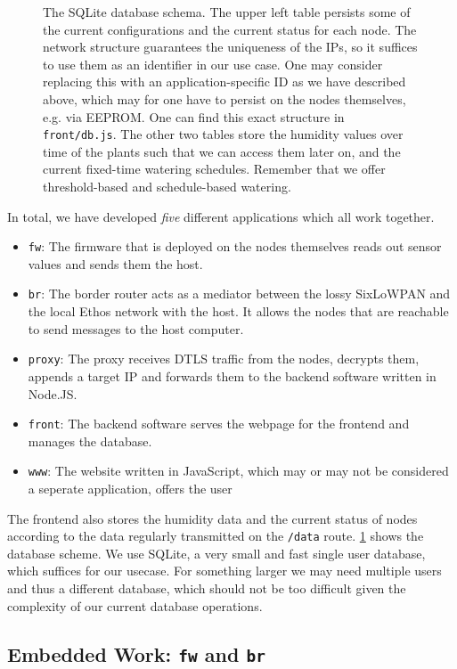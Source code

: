\documentclass[acmtog, language=english, nonacm]{acmart}
\begin{document}
\begin{figure}[!hbtp]
        \caption{The SQLite database schema. The upper left table persists some of the current configurations and the current status for each node. The network structure guarantees the uniqueness of the IPs, so it suffices to use them as an identifier in our use case. One may consider replacing this with an application-specific ID as we have described above, which may for one have to persist on the nodes themselves, e.g. via EEPROM. One can find this exact structure in \texttt{front/db.js}. The other two tables store the humidity values over time of the plants such that we can access them later on, and the current fixed-time watering schedules. Remember that we offer threshold-based and schedule-based watering.}
        \label{fig:db_scheme}
    \end{figure}

    In total, we have developed \emph{five} different applications which all work together.
    \begin{itemize}
        \item \texttt{fw}: The firmware that is deployed on the nodes themselves reads out sensor values and sends them the host.
        \item \texttt{br}: The border router acts as a mediator between the lossy SixLoWPAN and the local Ethos network with the host. It allows the nodes that are reachable to send messages to the host computer.
        \item \texttt{proxy}: The proxy receives DTLS traffic from the nodes, decrypts them, appends a target IP and forwards them to the backend software written in Node.JS.
        \item \texttt{front}: The backend software serves the webpage for the frontend and manages the database.
        \item \texttt{www}: The website written in JavaScript, which may or may not be considered a seperate application, offers the user
    \end{itemize}

    The frontend also stores the humidity data and the current status of nodes according to the data regularly transmitted on the \texttt{/data} route. \cref{fig:db_scheme} shows the database scheme. We use SQLite, a very small and fast single user database, which suffices for our usecase. For something larger we may need multiple users and thus a different database, which should not be too difficult given the complexity of our current database operations.

    \subsection{Embedded Work: \texttt{fw} and \texttt{br}}
\end{document}

